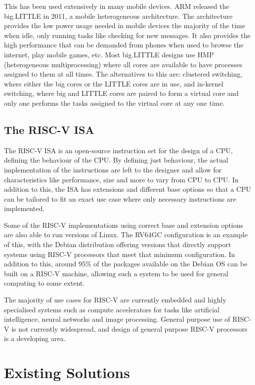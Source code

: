 \documentclass[a4paper,fleqn,11pt]{article}
\begin{document}
This has been used extensively in many mobile devices. ARM released the big.LITTLE in 2011\cite{biglittle}, a mobile heterogeneous architecture. The architecture provides the low power usage needed in mobile devices the majority of the time when idle, only running tasks like checking for new messages. It also provides the high performance that can be demanded from phones when used to browse the internet, play mobile games, etc. Most big.LITTLE designs use HMP (heterogeneous multiprocessing) where all cores are available to have processes assigned to them at all times. The alternatives to this are: clustered switching, where either the big cores or the LITTLE cores are in use, and in-kernel switching, where big and LITTLE cores are paired to form a virtual core and only one performs the tasks assigned to the virtual core at any one time.

\subsection{The RISC-V ISA}
The RISC-V ISA\cite{riscvISA} is an open-source instruction set for the design of a CPU, defining the behaviour of the CPU. By defining just behaviour, the actual implementation of the instructions are left to the designer and allow for characteristics like performance, size and more to vary from CPU to CPU. In addition to this, the ISA has extensions and different base options so that a CPU can be tailored to fit an exact use case where only necessary instructions are implemented.

Some of the RISC-V implementations using correct base and extension options are also able to run versions of Linux. The RV64GC configuration is an example of this, with the Debian distribution\cite{debianriscv} offering versions that directly support systems using RISC-V processors that meet that minimum configuration. In addition to this, around 95\% of the packages available on the Debian OS can be built on a RISC-V machine, allowing such a system to be used for general computing to some extent.

The majority of use cases for RISC-V are currently embedded and highly specialised systems such as compute accelerators for tasks like artificial intelligence, neural networks and image processing. General purpose use of RISC-V is not currently widespread, and design of general purpose RISC-V processors is a developing area.

\section{Existing Solutions}
\end{document}
